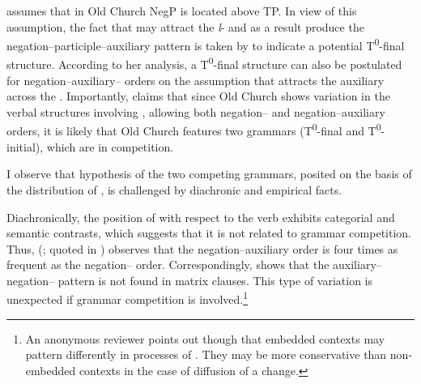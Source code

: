 \documentclass[output=paper,modfonts,newtxmath,hidelinks]{langscibook}
\begin{document}
\ea \label{11:ex22}
	\label{11:ex22a}
	\label{11:ex22b}
	\label{11:ex22c}
	\z
\z
\citeauthor{pancheva2008} assumes that in Old Church  NegP is located above TP. In view of this assumption, the fact that  may attract the \textit{l}{}- and as a result produce the negation--participle--auxiliary pattern is taken by \citeauthor{pancheva2008} to indicate a potential T\textsuperscript{0}{}-final structure. According to her analysis, a T\textsuperscript{0}{}-final structure can also be postulated for negation--auxiliary-- orders on the assumption that  attracts the auxiliary across the . Importantly, \citeauthor{pancheva2008} claims that since Old Church  shows variation in the verbal structures involving , allowing both negation-- and negation--auxiliary orders, it is likely that Old Church  features two grammars (T\textsuperscript{0}{}-final and T\textsuperscript{0}{}-initial), which are in competition.

I observe that  hypothesis of the two competing grammars, posited on the basis of the distribution of , is challenged by diachronic and empirical facts. 

Diachronically, the position of  with respect to the verb exhibits categorial and semantic contrasts, which suggests that it is not related to grammar competition. Thus, \citeauthor{vecerka1989} (\citeyear[34]{vecerka1989}; quoted in \citealt[328]{willis2000}) observes that the negation--auxiliary order is four times as frequent as the negation-- order. Correspondingly, \citet[329]{willis2000} shows that the auxiliary--negation-- pattern is not found in matrix clauses. This type of variation is unexpected if grammar competition is involved.\footnote{\label{11:fn4}An anonymous reviewer points out though that embedded contexts may pattern differently in processes of . They may be more conservative than non-embedded contexts in the case of diffusion of a change.}
\end{document}
